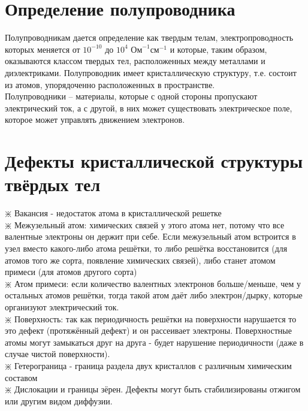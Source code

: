 \newcommand{\colontitulAutors}{astronom\_v\_cube}
\newcommand{\colontitulYear}{2022 }
\newcommand{\colontitulEducationalSubject}{Основы теории полупроводников}
\newcommand{\colontitulTeacher}{Оболенский С.В.}




	\small
	\begin{multicols*}{2}
		\section{Определение полупроводника}
		Полупроводникам дается определение как твердым телам, электропроводность которых меняется от $10^{-10}$ до $10^4$ $\text{Ом}^{-1} \text{см}^{-1}$ и которые, таким образом, оказываются классом твердых тел, расположенных между металлами и диэлектриками. Полупроводник имеет кристаллическую
		структуру, т.е. состоит из атомов, упорядоченно расположенных в пространстве.\\
		Полупроводники – материалы, которые с одной стороны пропускают электрический ток, а с другой, в них может существовать электрическое поле, которое может управлять движением электронов.

		\section{Дефекты кристаллической структуры твёрдых тел}
		$\divideontimes$ Вакансия - недостаток атома в кристаллической решетке\\
		$\divideontimes$ Межузельный атом: химических связей у этого атома нет, потому что все валентные электроны он держит при себе. Если межузельный атом встроится в узел вместо какого-либо атома решётки, то либо решётка восстановится (для атомов того же сорта, появление химических связей), либо станет атомом примеси (для атомов другого сорта)\\
		$\divideontimes$ Атом примеси: если количество валентных электронов больше/меньше, чем у остальных атомов решётки, тогда такой атом даёт либо электрон/дырку, которые организуют электрический ток.\\
		$\divideontimes$ Поверхность: так как периодичность решётки на поверхности нарушается то это дефект (протяжённый дефект) и он рассеивает электроны. Поверхностные атомы могут замыкаться друг на друга - будет нарушение периодичности (даже в случае чистой поверхности).\\
		$\divideontimes$ Гетерограница - граница раздела двух кристаллов с различным химическим составом\\
		$\divideontimes$ Дислокации и границы зёрен. Дефекты могут быть стабилизированы отжигом или другим видом диффузии.


\end{multicols*}

